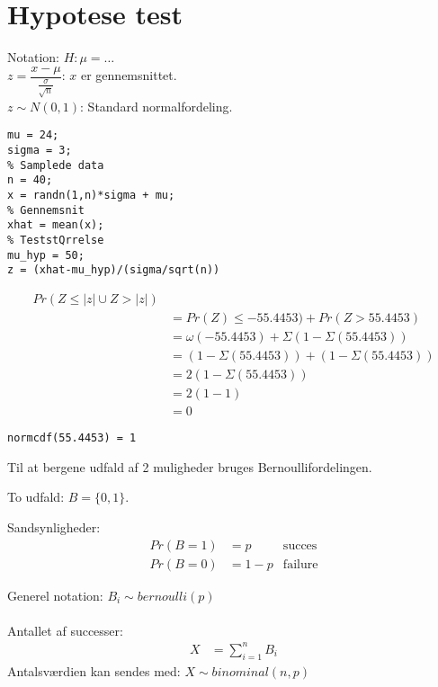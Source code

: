 \documentclass[Main]{subfiles}
\begin{document}
\chapter{Hypotese test}

\begin{theo}[Hypotesetest]
Notation: $H: \mu = \ldots $ \\
$ z = \dfrac{x - \mu}{ \frac{\sigma}{\sqrt{n}}}  $: $x$ er gennemsnittet.\\
$ z \sim N(0,1)$: Standard normalfordeling.

\begin{lstlisting}[style=Code-Matlab]
%Sand middelverdi og std. afvigelse
mu = 24;
sigma = 3;
% Samplede data
n = 40;
x = randn(1,n)*sigma + mu;
% Gennemsnit
xhat = mean(x);
% TeststQrrelse
mu_hyp = 50;
z = (xhat-mu_hyp)/(sigma/sqrt(n))
\end{lstlisting}


\begin{align*}
Pr ( Z \leq |z| \cup Z > |z|) & \\
	&= Pr(Z) \leq -55.4453) + Pr(Z > 55.4453) \\
	&= \omega(-55.4453) + \Sigma(1 - \Sigma(55.4453)) \\
	&= (1 - \Sigma(55.4453)) + (1 - \Sigma(55.4453)) \\
	&= 2(1 - \Sigma(55.4453)) \\
	&= 2(1-1) \\
	&= 0
\end{align*}

\begin{lstlisting}[style=Code-Matlab]
normcdf(55.4453) = 1
\end{lstlisting}
\end{theo}

Til at bergene udfald af 2 muligheder bruges Bernoullifordelingen.







\newpage
\begin{theo}[Bernoullifordelingen]
To udfald: $B = \{0,1\}$.



Sandsynligheder:
\begin{align*}
Pr(B=1) &= p & \text{succes} \\
Pr(B=0) &= 1-p & \text{failure}
\end{align*}

Generel notation: $B_i\sim bernoulli(p)$
\\
\\
Antallet af successer: 
\begin{align*}
X &= \sum_{i=1}^n B_i
\end{align*}
Antalsværdien kan sendes med: $X \sim binominal(n,p)$

\end{theo}
\end{document}
